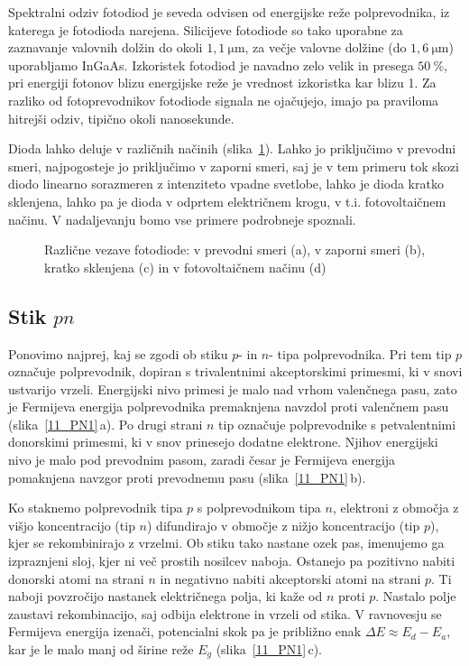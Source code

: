 Spektralni odziv fotodiod je seveda odvisen od energijske reže polprevodnika, 
iz katerega je fotodioda narejena.
Silicijeve fotodiode so tako uporabne za zaznavanje valovnih dolžin do okoli
$1,1~\si{\micro\meter}$, za
večje valovne dolžine (do $1,6~\si{\micro\meter}$) uporabljamo InGaAs. Izkoristek fotodiod
je navadno zelo velik in presega $50~\%$, pri energiji fotonov blizu energijske reže 
je vrednost izkoristka kar blizu 1.
Za razliko od fotoprevodnikov fotodiode signala
ne ojačujejo, imajo pa praviloma hitrejši odziv, tipično okoli nanosekunde.

Dioda lahko deluje v različnih načinih (slika~\ref{11_PD}). 
Lahko jo priključimo v prevodni smeri, najpogosteje jo priključimo v zaporni smeri, saj je v
tem primeru tok skozi diodo linearno sorazmeren z intenziteto vpadne svetlobe, lahko 
je dioda kratko sklenjena, lahko pa je dioda v odprtem električnem krogu, v t.i. fotovoltaičnem 
načinu. V nadaljevanju bomo vse primere podrobneje spoznali.
\begin{figure}[h]
\centering
\def\svgwidth{140truemm} 

\caption{Različne vezave fotodiode: v prevodni smeri (a), v zaporni smeri (b), kratko sklenjena (c) in 
v fotovoltaičnem načinu (d)}
\label{11_PD}
\end{figure}

\subsection*{Stik $pn$}
Ponovimo najprej, kaj se zgodi ob stiku $p$- in $n$- tipa polprevodnika. Pri tem tip $p$ označuje
polprevodnik, dopiran s trivalentnimi akceptorskimi primesmi, ki v snovi ustvarijo vrzeli.
Energijski nivo primesi je malo nad vrhom valenčnega pasu, zato je Fermijeva energija
polprevodnika premaknjena navzdol proti valenčnem pasu (slika~\ref{11_PN1}\,a). 
Po drugi strani $n$ tip označuje polprevodnike s petvalentnimi 
donorskimi primesmi, ki v snov prinesejo dodatne elektrone. Njihov energijski nivo je malo 
pod prevodnim pasom, zaradi česar je Fermijeva energija pomaknjena navzgor proti prevodnemu pasu
(slika~\ref{11_PN1}\,b).

Ko staknemo polprevodnik tipa $p$ s polprevodnikom tipa $n$, elektroni 
z območja z višjo koncentracijo (tip $n$) difundirajo v območje z nižjo koncentracijo
(tip $p$), kjer se rekombinirajo z vrzelmi. 
Ob stiku tako nastane ozek pas,  imenujemo ga izpraznjeni sloj, kjer ni več 
prostih nosilcev naboja. Ostanejo pa pozitivno nabiti donorski atomi na strani $n$
in negativno nabiti akceptorski atomi na strani $p$. Ti naboji povzročijo nastanek  
električnega polja, ki kaže od $n$ proti $p$. Nastalo polje zaustavi rekombinacijo, saj odbija
elektrone in vrzeli od stika. V ravnovesju se Fermijeva energija izenači, potencialni
skok pa je približno enak $\Delta E \approx E_d-E_a$, kar je le malo manj od 
širine reže $E_g$ (slika~\ref{11_PN1}\,c).

